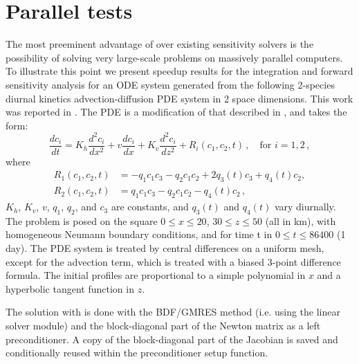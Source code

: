 \section{Parallel tests}\label{s:ex_tests}


The most preeminent advantage of {\cvodes} over existing sensitivity solvers is
the possibility of solving very large-scale problems on massively parallel 
computers. To illustrate this point we present speedup results for the 
integration and forward sensitivity analysis for
an ODE system generated from the following 2-species diurnal
kinetics advection-diffusion PDE system in 2 space dimensions.
This work was reported in \cite{SeHi:05}.
The PDE is a modification of that described in \cite{Wit:96}, and takes the form:
\begin{equation*}
  \frac{dc_i}{dt} = K_h \frac{d^2c_i}{dx^2} + v \frac{dc_i}{dx} 
  + K_v \frac{d^2c_i}{dz^2}
  + R_i(c_1, c_2, t) \, , \quad \text{for } i=1,2 \, ,
\end{equation*}
where
\begin{equation*}
  \begin{split}
    R_1(c_1,c_2,t) &= -q_1 c_1 c_3 - q_2 c_1 c_2 + 2 q_3(t) c_3 + q_4(t) c_2 , \\
    R_2(c_1,c_2,t) &=  q_1 c_1 c_3 - q_2 c_1 c_2 - q_4(t) c_2 \, ,
  \end{split}
\end{equation*}
$K_h$, $K_v$, $v$, $q_1$, $q_2$, and $c_3$ are constants, and $q_3(t)$ and $q_4(t)$
vary diurnally.   
The problem is posed on the square
$0 \le x \le 20$, $30 \le z \le 50$   (all in km),
with homogeneous Neumann boundary conditions, and for time t in
$0 \le t \le 86400$ (1 day).
The PDE system is treated by central differences on a uniform
mesh, except for the advection term, which is treated with a biased
3-point difference formula.
The initial profiles are proportional to a simple polynomial in $x$
and a hyperbolic tangent function in $z$.

The solution with {\cvodes} is done with the BDF/GMRES method (i.e.
using the {\sunlinsolspgmr} linear solver module) and the block-diagonal part of the 
Newton matrix as a left preconditioner. A copy of the block-diagonal
part of the Jacobian is saved and conditionally reused within the
preconditioner setup function.


